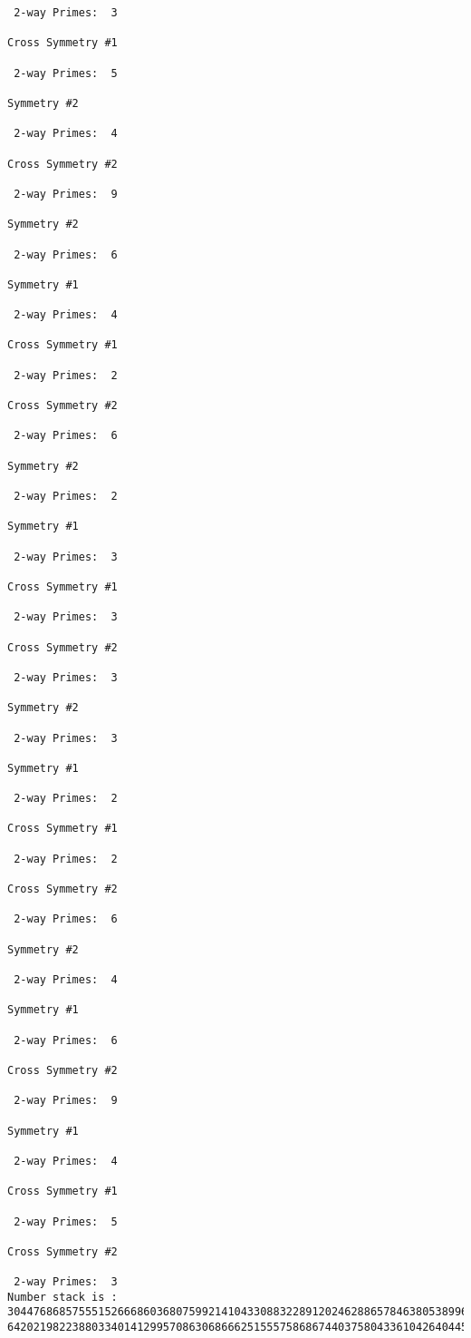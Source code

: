 \begin{verbatim}
 2-way Primes: 	3

Cross Symmetry #1

 2-way Primes: 	5

Symmetry #2

 2-way Primes: 	4

Cross Symmetry #2

 2-way Primes: 	9

Symmetry #2

 2-way Primes: 	6

Symmetry #1

 2-way Primes: 	4

Cross Symmetry #1

 2-way Primes: 	2

Cross Symmetry #2

 2-way Primes: 	6

Symmetry #2

 2-way Primes: 	2

Symmetry #1

 2-way Primes: 	3

Cross Symmetry #1

 2-way Primes: 	3

Cross Symmetry #2

 2-way Primes: 	3

Symmetry #2

 2-way Primes: 	3

Symmetry #1

 2-way Primes: 	2

Cross Symmetry #1

 2-way Primes: 	2

Cross Symmetry #2

 2-way Primes: 	6

Symmetry #2

 2-way Primes: 	4

Symmetry #1

 2-way Primes: 	6

Cross Symmetry #2

 2-way Primes: 	9

Symmetry #1

 2-way Primes: 	4

Cross Symmetry #1

 2-way Primes: 	5

Cross Symmetry #2

 2-way Primes: 	3
Number stack is :
30447686857555152666860368075992141043308832289120246288657846380538996794608835958544046240163340857
64202198223880334014129957086306866625155575868674403758043361042640445859538806497699835083648756882


\end{verbatim}
